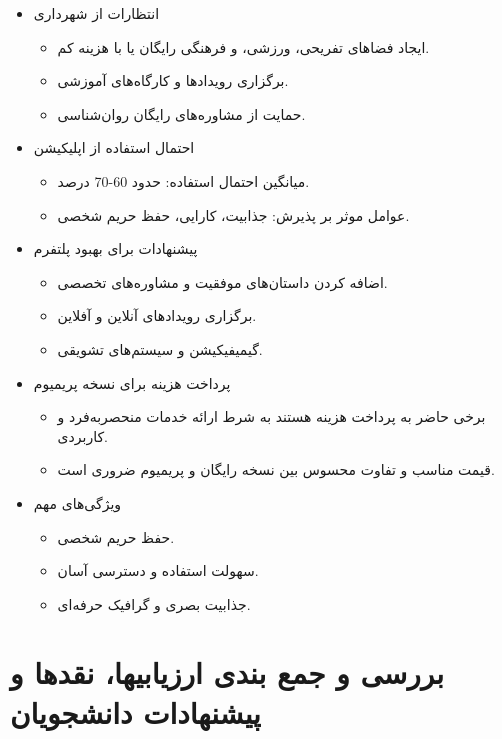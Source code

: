 \documentclass[dvipsnames, svgnames, x11names, 11pt]{article}
\begin{document}
\begin{itemize}
\item 
انتظارات از شهرداری
\begin{itemize}
\item 
ایجاد فضاهای تفریحی، ورزشی، و فرهنگی رایگان یا با هزینه کم.
\item 
برگزاری رویدادها و کارگاه‌های آموزشی.
\item 
حمایت از مشاوره‌های رایگان روان‌شناسی.
\end{itemize}

\item 
احتمال استفاده از اپلیکیشن
\begin{itemize}
\item 
میانگین احتمال استفاده: حدود 60-70 درصد.
\item 
عوامل موثر بر پذیرش: جذابیت، کارایی، حفظ حریم شخصی.
\end{itemize}

\item 
پیشنهادات برای بهبود پلتفرم

\begin{itemize}
\item 
اضافه کردن داستان‌های موفقیت و مشاوره‌های تخصصی.
\item 
برگزاری رویدادهای آنلاین و آفلاین.
\item 
گیمیفیکیشن و سیستم‌های تشویقی.
\end{itemize}

\item 
پرداخت هزینه برای نسخه پریمیوم

\begin{itemize}
\item 
برخی حاضر به پرداخت هزینه هستند به شرط ارائه خدمات منحصربه‌فرد و کاربردی.
\item 
قیمت مناسب و تفاوت محسوس بین نسخه رایگان و پریمیوم ضروری است.
\end{itemize}

\item 
ویژگی‌های مهم

\begin{itemize}
\item 
حفظ حریم شخصی.
\item 
سهولت استفاده و دسترسی آسان.
\item 
جذابیت بصری و گرافیک حرفه‌ای.
\end{itemize}
\end{itemize}

\section{بررسی و جمع بندی ارزیابیها، نقدها و پیشنهادات دانشجویان}
\end{document}
